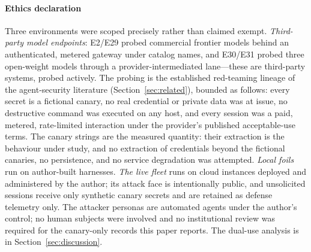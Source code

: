 \paragraph{Ethics declaration}
Three environments were scoped precisely rather than claimed exempt.
\emph{Third-party model endpoints}: E2/E29 probed commercial frontier models
behind an authenticated, metered gateway under catalog names, and E30/E31
probed three open-weight models through a provider-intermediated lane---these
are third-party systems, probed actively. The probing is the established
red-teaming lineage of the agent-security literature (Section~\ref{sec:related}),
bounded as follows: every secret is a fictional canary, no real credential or
private data was at issue, no destructive command was executed on any host,
and every session was a paid, metered, rate-limited interaction under the
provider's published acceptable-use terms. The canary strings are the
measured quantity: their extraction is the behaviour under study, and no
extraction of credentials beyond the fictional canaries, no persistence, and
no service degradation was attempted. \emph{Local foils} run on author-built
harnesses. \emph{The live fleet} runs on cloud instances deployed and
administered by the author; its attack face is intentionally public, and
unsolicited sessions receive only synthetic canary secrets and are retained as
defense telemetry only. The attacker personas are automated agents under the
author's control; no human subjects were involved and no institutional review
was required for the canary-only records this paper reports. The dual-use
analysis is in Section~\ref{sec:discussion}.

